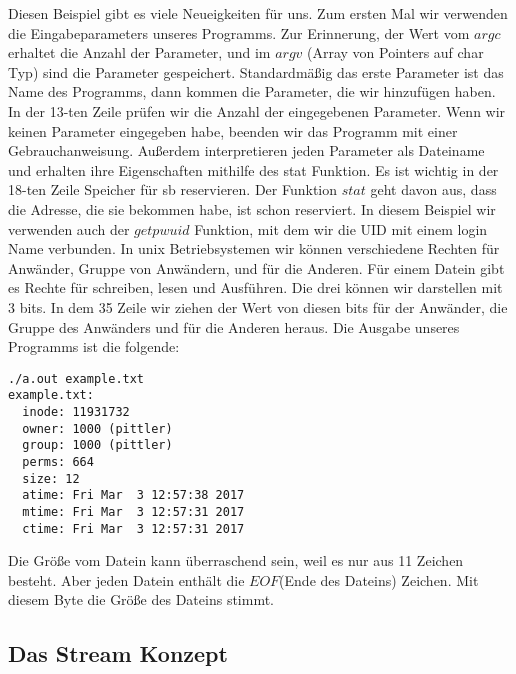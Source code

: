 \documentclass{article}[12pt]
\begin{document}
Diesen Beispiel gibt es viele Neueigkeiten für uns. Zum ersten Mal wir verwenden die Eingabeparameters unseres 
Programms. Zur Erinnerung, der Wert vom $argc$ erhaltet die Anzahl der Parameter, und im $argv$ (Array von Pointers auf
char Typ) sind die Parameter gespeichert. Standardmäßig das erste Parameter ist das Name des Programms, dann kommen
die Parameter, die wir hinzufügen haben. In der 13-ten Zeile prüfen wir die Anzahl der eingegebenen Parameter. Wenn
wir keinen Parameter eingegeben habe, beenden wir das Programm mit einer Gebrauchanweisung. Außerdem interpretieren 
jeden Parameter als Dateiname und erhalten ihre Eigenschaften mithilfe des stat Funktion. Es ist wichtig in der 18-ten
Zeile Speicher für sb reservieren. Der Funktion $stat$ geht davon aus, dass die Adresse, die sie bekommen habe, ist
schon reserviert. In diesem Beispiel wir verwenden auch der $getpwuid$ Funktion, mit dem wir die UID mit einem login 
Name verbunden. In unix Betriebsystemen wir können verschiedene Rechten für Anwänder, Gruppe von Anwändern, und für die
Anderen. Für einem Datein gibt es Rechte für schreiben, lesen und Ausführen. Die drei können wir darstellen mit 3 bits.
In dem 35 Zeile wir ziehen der Wert von diesen bits für der Anwänder, die Gruppe des Anwänders und für die Anderen heraus.
Die Ausgabe unseres Programms ist die folgende:
\begin{lstlisting}
./a.out example.txt
example.txt:
  inode: 11931732
  owner: 1000 (pittler)
  group: 1000 (pittler)
  perms: 664
  size: 12
  atime: Fri Mar  3 12:57:38 2017
  mtime: Fri Mar  3 12:57:31 2017
  ctime: Fri Mar  3 12:57:31 2017
\end{lstlisting}
Die Größe vom Datein kann überraschend sein, weil es nur aus 11 Zeichen besteht. Aber jeden Datein enthält die 
$EOF$(Ende des Dateins) Zeichen. Mit diesem Byte die Größe des Dateins stimmt.
\subsection{Das Stream Konzept}
\end{document}
